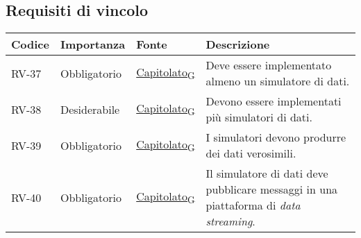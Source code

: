 \subsection{Requisiti di vincolo}
\begin{longtable}{|>{\centering\arraybackslash}m{}|>{\centering\arraybackslash}m{}|>{\centering\arraybackslash}m{}|>{\centering\arraybackslash}m{}|}
	\hline
	\textbf{Codice} & \textbf{Importanza} & \textbf{Fonte}                                                                                                    & \textbf{Descrizione}                                                                                                                                                                                                                                                                    \\\hline
	\endfirsthead
	\hline
	\endhead
	RV-37           & Obbligatorio        & \href{https://7last.github.io/docs/rtb/documentazione-interna/glossario\#capitolato}{Capitolato\textsubscript{G}} & Deve essere implementato almeno un simulatore di dati.                                                                                                                                                                                                                                  \\\hline
	RV-38           & Desiderabile        & \href{https://7last.github.io/docs/rtb/documentazione-interna/glossario\#capitolato}{Capitolato\textsubscript{G}} & Devono essere implementati più simulatori di dati.                                                                                                                                                                                                                                      \\\hline
	RV-39           & Obbligatorio        & \href{https://7last.github.io/docs/rtb/documentazione-interna/glossario\#capitolato}{Capitolato\textsubscript{G}} & I simulatori devono produrre dei dati verosimili.                                                                                                                                                                                                                                       \\\hline
	RV-40           & Obbligatorio        & \href{https://7last.github.io/docs/rtb/documentazione-interna/glossario\#capitolato}{Capitolato\textsubscript{G}} & Il simulatore di dati deve pubblicare messaggi in una piattaforma di \textit{data streaming}.                                                                                                                                                                                           \\\hline

\end{longtable}
